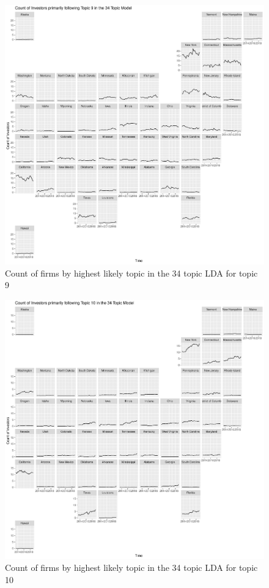 		\begin{figure}
		\centering
		\includegraphics[width=1\linewidth]{Figures/ChapterV/USA_34_Topic09.pdf}
		\caption[Count of Firms for Topic 9 by Quarter]{Count of firms by highest likely topic in the 34 topic LDA for topic 9}
		\label{fig:StateLDA9}
	\end{figure}
	
		\begin{figure}
		\centering
		\includegraphics[width=1\linewidth]{Figures/ChapterV/USA_34_Topic10.pdf}
		\caption[Count of Firms for Topic 10 by Quarter]{Count of firms by highest likely topic in the 34 topic LDA for topic 10}
		\label{fig:StateLDA10}
	\end{figure}
	

